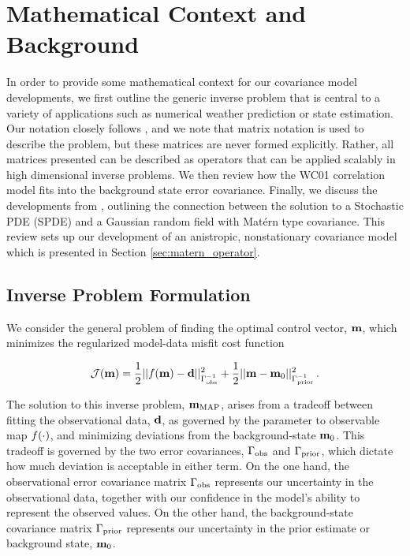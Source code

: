 \section{Mathematical Context and Background}
\label{sec:review}

In order to provide some mathematical context for our covariance model
developments, we first outline the generic inverse problem that is central to
a variety of applications such as numerical weather prediction or state
estimation.
Our notation closely follows \citet{ide_unified_1997}, and we note that matrix
notation is used to describe the problem, but these matrices are never formed
explicitly.
Rather, all matrices presented can be described as operators that can be applied
scalably in high dimensional inverse problems.
We then review how the WC01 correlation model fits into the background state
error covariance.
Finally, we discuss the developments from \citet{RSSB:RSSB777}, outlining the
connection between the solution to a Stochastic PDE (SPDE) and a Gaussian random
field with Mat\'ern type covariance.
This review sets up our development of an anistropic, nonstationary covariance
model which is presented in Section \ref{sec:matern_operator}.


\subsection{Inverse Problem Formulation}
\label{ssec:da_formulation}

We consider the general problem of finding the optimal control vector,
$\mathbf{m}$, which minimizes the regularized model-data misfit cost function
\begin{linenomath*}\begin{equation*}
    \mathcal{J}(\mathbf{m}) =
        \dfrac{1}{2}||f(\mathbf{m}) - \mathbf{d}||_{\Gamma_\text{obs}^{-1}}^2
        +
        \dfrac{1}{2}||\mathbf{m} - \mathbf{m}_{0}||_{\Gamma_{\text{prior}}^{-1}}^2 \, .
\end{equation*}\end{linenomath*}
The solution to this inverse problem, $\mathbf{m}_{\text{MAP}}$, arises from a tradeoff between fitting the
observational data, $\mathbf{d}$, as governed by the parameter to observable map
$f(\cdot)$, and minimizing deviations from the background-state $\mathbf{m}_{0}$.
This tradeoff is governed by the two error covariances, $\Gamma_\text{obs}$ and
$\Gamma_{\text{prior}}$, which dictate how much deviation is acceptable in either term.
On the one hand, the observational error covariance matrix
$\Gamma_\text{obs}$ represents our uncertainty
in the observational data, together with our confidence in the model's ability
to represent the observed values.
On the other hand, the background-state covariance matrix $\Gamma_{\text{prior}}$
represents our uncertainty in the prior estimate or background state,
$\mathbf{m}_{0}$.

